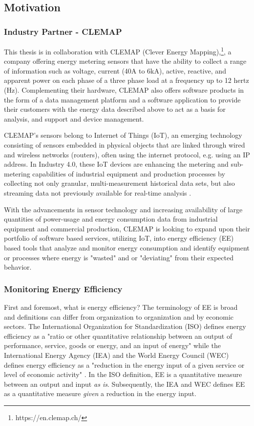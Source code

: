 \subsection{Motivation}

\subsubsection{Industry Partner - CLEMAP}
This thesis is in collaboration with CLEMAP (Clever Energy Mapping),\footnote[1]{https://en.clemap.ch/}, a company offering energy metering sensors that have the ability to collect a range of information such as voltage, current (40A to 6kA), active, reactive, and apparent power on each phase of a three phase load at a frequency up to 12 hertz (Hz). Complementing their hardware, CLEMAP also offers software products in the form of a data management platform and a software application to provide their customers with the energy data described above to act as a basis for analysis, and support and device management.

CLEMAP’s sensors belong to Internet of Things (IoT), an emerging technology consisting of sensors embedded in physical objects that are linked through wired and wireless networks (routers), often using the internet protocol, e.g. using an IP address. In Industry 4.0, these IoT devices are enhancing the metering and sub-metering capabilities of industrial equipment and production processes by collecting not only granular, multi-measurement historical data sets, but also streaming data not previously available for real-time analysis \cite{iot-1}.

With the advancements in sensor technology and increasing availability of large quantities of power-usage and energy consumption data from industrial equipment and commercial production, CLEMAP is looking to expand upon their portfolio of software based services, utilizing IoT, into energy efficiency (EE) based tools that analyze and monitor energy consumption and identify equipment or processes where energy is "wasted" and or "deviating" from their expected behavior.

\subsubsection{Monitoring Energy Efficiency}

First and foremost, what is energy efficiency? The terminology of EE is broad and definitions can differ from organization to organization and by economic sectors. The International Organization for Standardization (ISO) defines energy efficiency as a "ratio or other quantitative relationship between an output of performance, service, goods or energy, and an input of energy" \cite{ISO} while the International Energy Agency (IEA) and the World Energy Council (WEC) defines energy efficiency as a "reduction in the energy input of a given service or level of economic activity" \cite{iea-wec}. In the ISO definition, EE is a quantitative measure between an output and input \textit{as is}. Subsequently, the IEA and WEC defines EE as a quantitative measure \textit{given} a reduction in the energy input.

